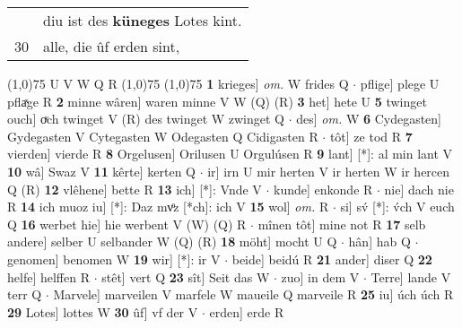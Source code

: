 \documentclass[8pt,a4paper,notitlepage]{article}
\begin{document}
\begin{table}[ht]
\begin{minipage}[t]{0.5\linewidth}
\begin{tabular}{rl}
 & diu ist des \textbf{küneges} Lotes kint.\\ 
30 & alle, die ûf erden sint,\\ 
\end{tabular}
\scriptsize
\line(1,0){75} \newline
U V W Q R \newline
\line(1,0){75} \newline
\newline
\line(1,0){75} \newline
\textbf{1} krieges] \textit{om.} W frides Q  $\cdot$ pflige] plege U pflaͯge R \textbf{2} minne wâren] waren minne V W (Q) (R) \textbf{3} het] hete U \textbf{5} twinget ouch] oͮch twinget V (R) des twinget W zwinget Q  $\cdot$ des] \textit{om.} W \textbf{6} Cydegasten] Gydegasten V Cytegasten W Odegasten Q Cidigasten R  $\cdot$ tôt] ze tod R \textbf{7} vierden] vierde R \textbf{8} Orgelusen] Orilusen U Orgulúsen R \textbf{9} lant] [*]: al min lant V \textbf{10} wâ] Swaz V \textbf{11} kêrte] kerten Q  $\cdot$ ir] irn U mir herten V ir herten W ir hercen Q (R) \textbf{12} vlêhene] bette R \textbf{13} ich] [*]: Vnde V  $\cdot$ kunde] enkonde R  $\cdot$ nie] dach nie R \textbf{14} ich muoz iu] [*]: Daz mvͦz [*ch]: ich V \textbf{15} wol] \textit{om.} R  $\cdot$ si] sv́ [*]: v́ch V euch Q \textbf{16} werbet hie] hie werbent V (W) (Q) R  $\cdot$ mînen tôt] mine not R \textbf{17} selb andere] selber U selbander W (Q) (R) \textbf{18} möht] mocht U Q  $\cdot$ hân] hab Q  $\cdot$ genomen] benomen W \textbf{19} wir] [*]: ir V  $\cdot$ beide] beidú R \textbf{21} ander] diser Q \textbf{22} helfe] helffen R  $\cdot$ stêt] vert Q \textbf{23} sît] Seit das W  $\cdot$ zuo] in dem V  $\cdot$ Terre] lande V terr Q  $\cdot$ Marvele] marveilen V marfele W maueile Q marveile R \textbf{25} iu] úch úch R \textbf{29} Lotes] lottes W \textbf{30} ûf] vf der V  $\cdot$ erden] erde R \newline
\end{minipage}
\end{table}
\end{document}
